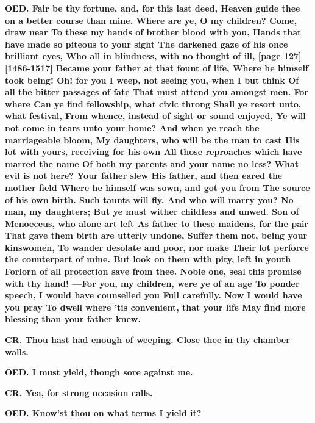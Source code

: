 \documentclass[11pt,letter]{book}
\begin{document}
\par \textbf{OED. Fair be thy fortune, and, for this last deed, Heaven guide thee on a better course than mine. Where are ye, O my children? Come, draw near To these my hands of brother blood with you, Hands that have made so piteous to your sight The darkened gaze of his once brilliant eyes, Who all in blindness, with no thought of ill, [page 127][1486-1517] Became your father at that fount of life, Where he himself took being! Oh! for you I weep, not seeing you, when I but think Of all the bitter passages of fate That must attend you amongst men. For where Can ye find fellowship, what civic throng Shall ye resort unto, what festival, From whence, instead of sight or sound enjoyed, Ye will not come in tears unto your home? And when ye reach the marriageable bloom, My daughters, who will be the man to cast His lot with yours, receiving for his own All those reproaches which have marred the name Of both my parents and your name no less? What evil is not here? Your father slew His father, and then eared the mother field Where he himself was sown, and got you from The source of his own birth. Such taunts will fly. And who will marry you? No man, my daughters; But ye must wither childless and unwed. Son of Menoeceus, who alone art left As father to these maidens, for the pair That gave them birth are utterly undone, Suffer them not, being your kinswomen, To wander desolate and poor, nor make Their lot perforce the counterpart of mine. But look on them with pity, left in youth Forlorn of all protection save from thee. Noble one, seal this promise with thy hand! —For you, my children, were ye of an age To ponder speech, I would have counselled you Full carefully. Now I would have you pray To dwell where ’tis convenient, that your life May find more blessing than your father knew.}
\par 

\par \textbf{CR. Thou hast had enough of weeping. Close thee in thy chamber walls.}
\par 

\par \textbf{OED. I must yield, though sore against me.}
\par 

\par \textbf{CR. Yea, for strong occasion calls.}
\par 

\par \textbf{OED. Know’st thou on what terms I yield it?}
\par 
\end{document}
